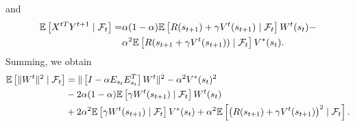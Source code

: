and
\begin{align*}
	\mathbb{E}\left[X^{tT} Y^{t+1}\mid \mathcal{F}_t\right] = & \alpha(1 - \alpha)
	\mathbb{E}\left[R(s_{t+1}) + \gamma V^t(s_{t+1})\mid \mathcal{F}_t \right]W^t(s_t)
	- \\&\alpha^2 \mathbb{E}\left[R(s_{t+1} + \gamma V^t(s_{t+1}))\mid \mathcal{F}_t\right] V^*(s_t).
\end{align*}
Summing, we obtain
\begin{align*}
	\mathbb{E}\left[\|W^t\|^2\mid \mathcal{F}_t\right] &=
	\|\left[I - \alpha E_{s_t}E_{s_t}^T\right]W^t\|^2
	- \alpha^2 V^*(s_t)^2 \\
	&-2 \alpha (1 - \alpha) \mathbb{E}\left[\gamma W^t(s_{t+1})\mid \mathcal{F}_t\right] W^t(s_t)
	 \\
	&+2 \alpha^2 \mathbb{E}\left[\gamma W^t(s_{t+1})\mid \mathcal{F}_t\right] V^*(s_t) +
	\alpha^2
	\mathbb{E}\left[{\left(R(s_{t+1}) + \gamma V^t(s_{t+1})\right)}^2\mid \mathcal{F}_t\right].
\end{align*}
